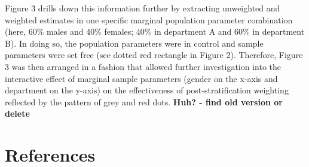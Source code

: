 \documentclass[
  man,floatsintext]{apa7}
\begin{document}
Figure 3 drills down this information further by extracting unweighted and weighted estimates in one specific marginal population parameter combination (here, 60\% males and 40\% females; 40\% in department A and 60\% in department B). In doing so, the population parameters were in control and sample parameters were set free (see dotted red rectangle in Figure 2). Therefore, Figure 3 was then arranged in a fashion that allowed further investigation into the interactive effect of marginal sample parameters (gender on the x-axis and department on the y-axis) on the effectiveness of post-stratification weighting reflected by the pattern of grey and red dots. \textbf{Huh? - find old version or delete}

\newpage

\hypertarget{references}{%
\section{References}\label{references}}

\begingroup
\setlength{\parindent}{-0.5in}
\setlength{\leftskip}{0.5in}
\end{document}
